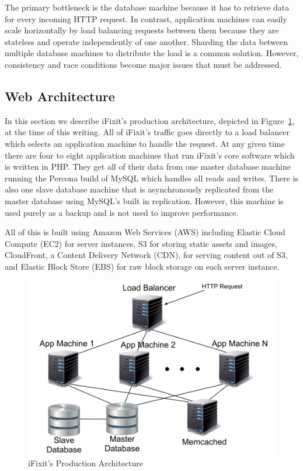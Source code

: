 \documentclass[12pt]{ucthesis}
\begin{document}
The primary bottleneck is the database machine because it has to retrieve data for every incoming HTTP request.
In contrast, application machines can easily scale horizontally by load balancing requests between them because they are stateless and operate independently of one another.
Sharding the data between multiple database machines to distribute the load is a common solution.
However, consistency and race conditions become major issues that must be addressed.

\subsection{Web Architecture}
In this section we describe \textsf{iFixit}'s production architecture, depicted in Figure~\ref{fig:iFixitArchitecture}, at the time of this writing.
All of \textsf{iFixit}'s traffic goes directly to a load balancer which selects an application machine to handle the request.
At any given time there are four to eight application machines that run \textsf{iFixit}'s core software which is written in PHP.
They get all of their data from one master database machine running the Percona build of \textsf{MySQL} which handles all reads and writes.
There is also one slave database machine that is asynchronously replicated from the master database using \textsf{MySQL}'s built in replication.
However, this machine is used purely as a backup and is not used to improve performance.

All of this is built using Amazon Web Services (AWS) including Elastic Cloud Compute (EC2) for server instances, S3 for storing static assets and images, CloudFront, a Content Delivery Network (CDN), for serving content out of S3, and Elastic Block Store (EBS) for raw block storage on each server instance.

\begin{figure}[h]
\centering
\includegraphics[width=\textwidth]{assets/iFixitArchitecture.png}
\caption{iFixit's Production Architecture}
\label{fig:iFixitArchitecture}
\end{figure}
\end{document}
